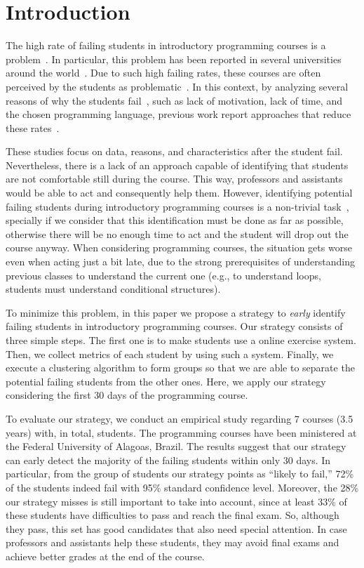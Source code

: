 \section{Introduction}

The high rate of failing students in introductory programming courses is a problem~\cite{}. In particular, this problem has been reported in several universities around the world~\cite{}. Due to such high failing rates, these courses are often perceived by the students as problematic~\cite{yadin-inroads-acm-11}. In this context, by analyzing several reasons of why the students fail~\cite{why-dropout-icer06}, such as lack of motivation, lack of time, and the chosen programming language, previous work report approaches that reduce these rates~\cite{yadin-inroads-acm-11, xxx}.

These studies focus on data, reasons, and characteristics after the student fail. Nevertheless, there is a lack of an approach capable of identifying that students are not comfortable still during the course. This way, professors and assistants would be able to act and consequently help them. However, identifying potential failing students during introductory programming courses is a non-trivial task~\cite{}, specially if we consider that this identification must be done as far as possible, otherwise there will be no enough time to act and the student will drop out the course anyway. When considering programming courses, the situation gets worse even when acting just a bit late, due to the strong prerequisites of understanding previous classes to understand the current one (e.g., to understand loops, students must understand conditional structures).

To minimize this problem, in this paper we propose a strategy to \textit{early} identify failing students in introductory programming courses. Our strategy consists of three simple steps. The first one is to make students use a online exercise system. Then, we collect metrics of each student by using such a system. Finally, we execute a clustering algorithm to form groups so that we are able to separate the potential failing students from the other ones. Here, we apply our strategy considering the first 30 days of the programming course.

To evaluate our strategy, we conduct an empirical study regarding 7 courses (3.5 years) with, in total, \totalStudents students. The programming courses have been ministered at the Federal University of Alagoas, Brazil. The results suggest that our strategy can early detect the majority of the failing students within only 30 days. In particular, from the group of students our strategy points as ``likely to fail,'' 72\% of the students indeed fail with 95\% standard confidence level. Moreover, the 28\% our strategy misses is still important to take into account, since at least 33\% of these students have difficulties to pass and reach the final exam. So, although they pass, this set has good candidates that also need special attention. In case professors and assistants help these students, they may avoid final exams and achieve better grades at the end of the course.

